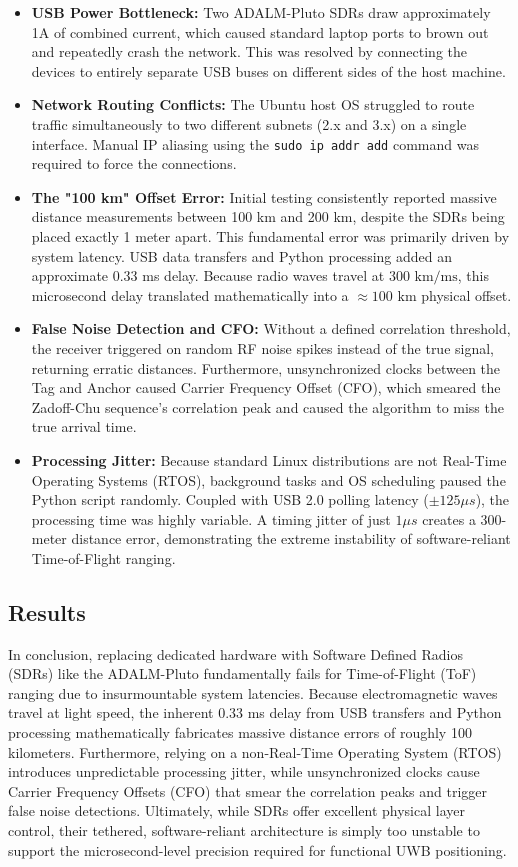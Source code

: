 \documentclass[conference]{IEEEtran}
\begin{document}
\begin{itemize}
    \item \textbf{USB Power Bottleneck:} Two ADALM-Pluto SDRs draw approximately 1A of combined current, which caused standard laptop ports to brown out and repeatedly crash the network. This was resolved by connecting the devices to entirely separate USB buses on different sides of the host machine.
    \item \textbf{Network Routing Conflicts:} The Ubuntu host OS struggled to route traffic simultaneously to two different subnets (2.x and 3.x) on a single interface. Manual IP aliasing using the \texttt{sudo ip addr add} command was required to force the connections.
    \item \textbf{The "100 km" Offset Error:} Initial testing consistently reported massive distance measurements between 100 km and 200 km, despite the SDRs being placed exactly 1 meter apart. This fundamental error was primarily driven by system latency. USB data transfers and Python processing added an approximate 0.33 ms delay. Because radio waves travel at $300 \text{ km/ms}$, this microsecond delay translated mathematically into a $\approx 100 \text{ km}$ physical offset.
    \item \textbf{False Noise Detection and CFO:} Without a defined correlation threshold, the receiver triggered on random RF noise spikes instead of the true signal, returning erratic distances. Furthermore, unsynchronized clocks between the Tag and Anchor caused Carrier Frequency Offset (CFO), which smeared the Zadoff-Chu sequence's correlation peak and caused the algorithm to miss the true arrival time.
    \item \textbf{Processing Jitter:} Because standard Linux distributions are not Real-Time Operating Systems (RTOS), background tasks and OS scheduling paused the Python script randomly. Coupled with USB 2.0 polling latency ($\pm 125 \mu s$), the processing time was highly variable. A timing jitter of just $1 \mu s$ creates a 300-meter distance error, demonstrating the extreme instability of software-reliant Time-of-Flight ranging.
\end{itemize}

\subsection{Results}
In conclusion, replacing dedicated hardware with Software Defined Radios (SDRs) like the ADALM-Pluto fundamentally fails for Time-of-Flight (ToF) ranging due to insurmountable system latencies. Because electromagnetic waves travel at light speed, the inherent 0.33 ms delay from USB transfers and Python processing mathematically fabricates massive distance errors of roughly 100 kilometers. Furthermore, relying on a non-Real-Time Operating System (RTOS) introduces unpredictable processing jitter, while unsynchronized clocks cause Carrier Frequency Offsets (CFO) that smear the correlation peaks and trigger false noise detections. Ultimately, while SDRs offer excellent physical layer control, their tethered, software-reliant architecture is simply too unstable to support the microsecond-level precision required for functional UWB positioning.
\newpage
\end{document}
